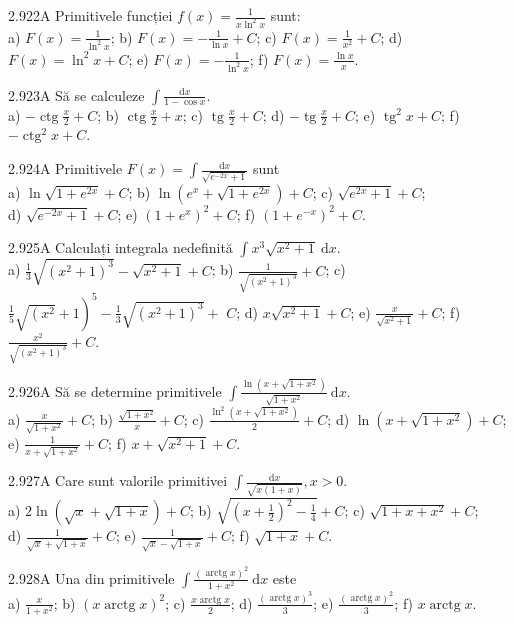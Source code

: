 \documentclass[11pt]{article}
\begin{document}
2.922A Primitivele funcției $f(x)=\frac{1}{x \ln ^{2} x}$ sunt:\\ a) $F(x)=\frac{1}{\ln ^{2} x}$; b) $F(x)=-\frac{1}{\ln x}+C$; c) $F(x)=\frac{1}{x^{2}}+C$; d) $F(x)=\ln ^{2} x+C$; e) $F(x)=-\frac{1}{\ln ^{2} x}$; f) $F(x)=\frac{\ln x}{x}$.

2.923A Să se calculeze $\int \frac{\mathrm{d} x}{1-\cos x}$.\\ a) $-\operatorname{ctg} \frac{x}{2}+C$; b) $\operatorname{ctg} \frac{x}{2}+x$; c) $\operatorname{tg} \frac{x}{2}+C$; d) $-\operatorname{tg} \frac{x}{2}+C$; e) $\operatorname{tg}^{2} x+C$; f) $-\operatorname{ctg}^{2} x+C$.

2.924A Primitivele $F(x)=\int \frac{\mathrm{d} x}{\sqrt{e^{-2 x}+1}}$ sunt\\ a) $\ln \sqrt{1+e^{2x}} + C$; b) $\ln \left(e^{x} + \sqrt{1 + e^{2x}}\right) + C$; c) $\sqrt{e^{2x} + 1} + C$;\\ d) $\sqrt{e^{-2x} + 1} + C$; e) $\left(1 + e^{x}\right)^{2} + C$; f) $\left(1 + e^{-x}\right)^{2} + C$.

2.925A Calculați integrala nedefinită $\int x^{3} \sqrt{x^{2}+1} \mathrm{~d} x$.\\ a) $\frac{1}{3} \sqrt{\left(x^{2}+1\right)^{3}}-\sqrt{x^{2}+1}+C$; b) $\frac{1}{\sqrt{\left(x^{2}+1\right)^{3}}}+C$; c) $\left.\frac{1}{5} \sqrt{\left(x^{2}\right.}+1\right)^{5}-\frac{1}{3} \sqrt{\left(x^{2}+1\right)^{3}}+$ $C$; d) $x \sqrt{x^{2}+1}+C$; e) $\frac{x}{\sqrt{x^{2}+1}}+C$; f) $\frac{x^{2}}{\sqrt{\left(x^{2}+1\right)^{3}}}+C$.

2.926A Să se determine primitivele $\int \frac{\ln \left(x+\sqrt{1+x^{2}}\right)}{\sqrt{1+x^{2}}} \mathrm{~d} x$.\\ a) $\frac{x}{\sqrt{1+x^{2}}}+C$; b) $\frac{\sqrt{1+x^{2}}}{x}+C$; c) $\frac{\ln ^{2}\left(x+\sqrt{1+x^{2}}\right)}{2}+C$; d) $\ln \left(x+\sqrt{1+x^{2}}\right)+C$; e) $\frac{1}{x+\sqrt{1+x^{2}}}+C$; f) $x+\sqrt{x^{2}+1}+C$.

2.927A Care sunt valorile primitivei $\int \frac{\mathrm{d} x}{\sqrt{x(1+x)}}, x>0$.\\ a) $2 \ln (\sqrt{x}+\sqrt{1+x})+C$; b) $\sqrt{\left(x+\frac{1}{2}\right)^{2}-\frac{1}{4}}+C$; c) $\sqrt{1+x+x^{2}}+C$;\\ d) $\frac{1}{\sqrt{x}+\sqrt{1+x}}+C$; e) $\frac{1}{\sqrt{x}-\sqrt{1+x}}+C$; f) $\sqrt{1+x}+C$.

2.928A Una din primitivele $\int \frac{(\operatorname{arctg} x)^{2}}{1+x^{2}} \mathrm{~d} x$ este\\ a) $\frac{x}{1+x^{2}}$; b) $(x \operatorname{arctg} x)^{2}$; c) $\frac{x \operatorname{arctg} x}{2}$; d) $\frac{(\operatorname{arctg} x)^{3}}{3}$; e) $\frac{(\operatorname{arctg} x)^{2}}{3}$; f) $x \operatorname{arctg} x$.
\end{document}
